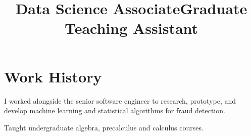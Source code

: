 
\section{\sc  Work History}

 \title{Data Science Associate} 

\begin{position}
I worked alongside the senior software engineer to research, prototype, and develop machine learning and statistical algorithms for fraud detection.
\end{position}


 \title{Graduate Teaching Assistant} 

\begin{position}
Taught undergraduate algebra, precalculus and calculus courses. 
\end{position}

